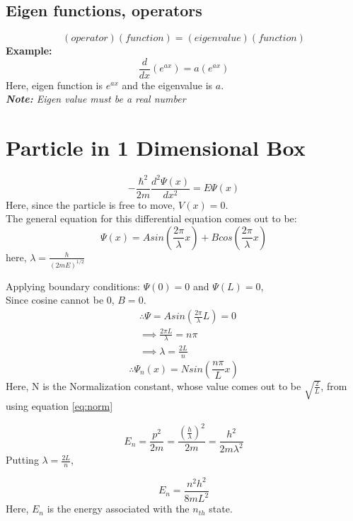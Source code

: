 \documentclass[12pt]{extarticle}
\begin{document}
\subsection{Eigen functions, operators}
\[
	(operator)(function) = (eigenvalue)(function)
\]
\textbf{Example:} 
\[
	\frac{d}{dx} \left( e^{ax} \right) = a \left( e^{ax} \right)
\]
Here, eigen function is $e^{ax}$ and the eigenvalue is $a$. \\
\textit{\textbf{Note:} Eigen value must be a real number} 

\section{Particle in 1 Dimensional Box}
\begin{equation}
	- \frac{\hbar^2}{2m} \frac{d^2\Psi(x)}{dx^2} = E \Psi(x) 
\end{equation}
Here, since the particle is free to move, $V(x) = 0$. \\

The general equation for this differential equation comes out to be: 
\begin{equation}
	\Psi(x) = A sin \left( \frac{2 \pi}{\lambda} x \right) + B cos \left(\frac{2 \pi}{\lambda} x \right)
\end{equation}
here, $\lambda = \frac{h}{(2mE)^{1/2}}$

Applying boundary conditions: $\Psi(0) = 0$ and $\Psi(L) = 0$, \\
Since cosine cannot be 0, $B = 0$.
\begin{align*}
	&\therefore \Psi = A sin \left(  \frac{2\pi}{\lambda} L \right) = 0 \\
	&\implies \frac{2\pi L}{\lambda} = n\pi \\
	&\implies \lambda = \frac{2L}{n} 
\end{align*}
\begin{equation}
	\therefore \Psi_n(x) = Nsin \left(  \frac{n\pi}{L} x \right)
\end{equation}
Here, N is the Normalization constant, whose value comes out to be $ \sqrt{ \frac{2}{L}}$, from using equation \ref{eq:norm}

\begin{equation*}
	E_n = \frac{p^2}{2m} = \frac{ \left( \frac{h}{\lambda}  \right) ^2 }{2m} = \frac{h^2}{2m\lambda^2}  
\end{equation*}
Putting $\lambda = \frac{2L}{n}$, 

\begin{equation}
	E_n = \frac{n^2h^2}{8mL^2} 
\end{equation}
Here, $E_n$ is the energy associated with the $n_{th}$ state.\\
\end{document}
